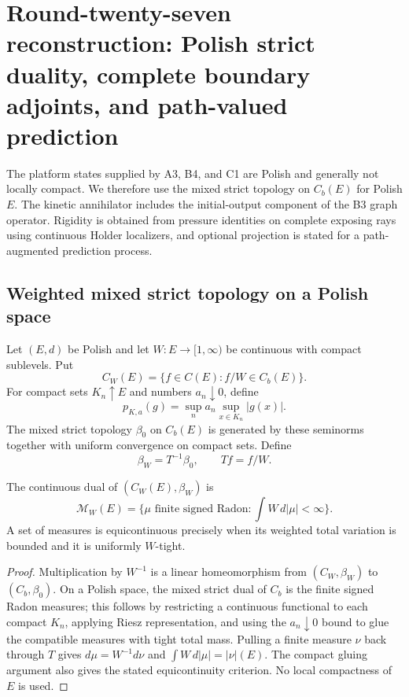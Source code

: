 
\section{Round-twenty-seven reconstruction: Polish strict duality, complete boundary adjoints, and path-valued prediction}
\label{sec:r27-c2}

The platform states supplied by A3, B4, and C1 are Polish and generally not
locally compact.  We therefore use the mixed strict topology on $C_b(E)$ for
Polish $E$.  The kinetic annihilator includes the initial-output component of
the B3 graph operator.  Rigidity is obtained from pressure identities on
complete exposing rays using continuous Holder localizers, and optional
projection is stated for a path-augmented prediction process.

\subsection{Weighted mixed strict topology on a Polish space}

Let $(E,d)$ be Polish and let $W:E\to[1,\infty)$ be continuous with compact
sublevels.  Put
\[
 C_W(E)=\{f\in C(E):f/W\in C_b(E)\}.
\]
For compact sets $K_n\uparrow E$ and numbers $a_n\downarrow0$, define
\[
 p_{K,a}(g)=\sup_n a_n\sup_{x\in K_n}|g(x)|.
\]
The mixed strict topology $\beta_0$ on $C_b(E)$ is generated by these
seminorms together with uniform convergence on compact sets.  Define
\[
 \beta_W=T^{-1}\beta_0,\qquad T f=f/W.                    \tag{C2.1}
\]

\begin{theorem}
\label{thm:r27-c2-dual}
The continuous dual of $(C_W(E),\beta_W)$ is
\[
 \mathcal M_W(E)=\{\mu\text{ finite signed Radon}:
                    \int W\,d|\mu|<\infty\}.              \tag{C2.2}
\]
A set of measures is equicontinuous precisely when its weighted total
variation is bounded and it is uniformly $W$-tight.
\end{theorem}

\begin{proof}
Multiplication by $W^{-1}$ is a linear homeomorphism from
$(C_W,\beta_W)$ to $(C_b,\beta_0)$.  On a Polish space, the mixed strict dual
of $C_b$ is the finite signed Radon measures; this follows by restricting a
continuous functional to each compact $K_n$, applying Riesz representation,
and using the $a_n\downarrow0$ bound to glue the compatible measures with
tight total mass.  Pulling a finite measure $\nu$ back through $T$ gives
$d\mu=W^{-1}d\nu$ and
$\int W\,d|\mu|=|\nu|(E)$.  The compact gluing argument also gives the stated
equicontinuity criterion.  No local compactness of $E$ is used.
\end{proof}

